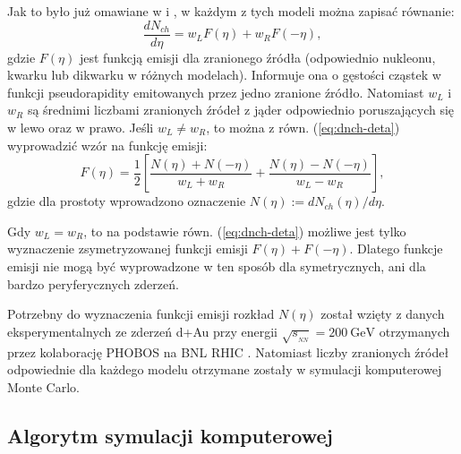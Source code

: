 \documentclass[a4paper,12pt]{article}
\begin{document}
Jak to było już omawiane w \cite{Barej:pracaInz18} i \cite{Barej:2017kcw}, w każdym z tych modeli można zapisać równanie:
\begin{equation} \label{eq:dnch-deta}
\frac{dN_{ch}}{d\eta} = w_{L} F(\eta) + w_{R} F(-\eta),
\end{equation}
gdzie $F(\eta)$ jest funkcją emisji dla zranionego źródła (odpowiednio nukleonu, kwarku lub dikwarku w różnych modelach). Informuje ona o gęstości cząstek w funkcji pseudorapidity emitowanych przez jedno zranione źródło. Natomiast $w_{L}$ i $w_{R}$ są średnimi liczbami zranionych źródeł z jąder odpowiednio poruszających się w lewo oraz w prawo. Jeśli $w_{L} \neq w_{R}$, to można z równ. (\ref{eq:dnch-deta}) wyprowadzić wzór na funkcję emisji:
\begin{equation} \label{eq:fragm-fun}
F(\eta) = \frac{1}{2} \left[ \frac{N(\eta) + N(-\eta)}{w_{L} + w_{R}} + \frac{N(\eta) - N(-\eta)}{w_{L} - w_{R}} \right],
\end{equation}
gdzie dla prostoty wprowadzono oznaczenie $N(\eta) := dN_{ch}(\eta)/d\eta$.

Gdy $w_{L} = w_{R}$, to na podstawie równ. (\ref{eq:dnch-deta}) możliwe jest tylko wyznaczenie zsymetryzowanej funkcji emisji $F(\eta) + F(-\eta)$. Dlatego funkcje emisji nie mogą być wyprowadzone w ten sposób dla symetrycznych, ani dla bardzo peryferycznych zderzeń.

Potrzebny do wyznaczenia funkcji emisji rozkład $N(\eta)$ został wzięty z danych eksperymentalnych ze zderzeń d+Au przy energii $\sqrt{s_{_{NN}}} = 200~\text{GeV}$ otrzymanych przez kolaborację PHOBOS na BNL RHIC \cite{Back:2004mr}. Natomiast liczby zranionych źródeł odpowiednie dla każdego modelu otrzymane zostały w symulacji komputerowej Monte Carlo.

\subsection{Algorytm symulacji komputerowej} \label{algorytm}
\end{document}
